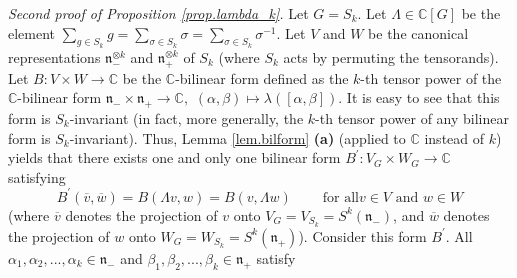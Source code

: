 \documentclass[etingof-lie.tex]{subfiles}
\begin{document}
\textit{Second proof of Proposition \ref{prop.lambda_k}.} Let $G=S_{k}$. Let
$\Lambda\in\mathbb{C}\left[  G\right]  $ be the element $\sum\limits_{g\in
S_{k}}g=\sum\limits_{\sigma\in S_{k}}\sigma=\sum\limits_{\sigma\in S_{k}%
}\sigma^{-1}$. Let $V$ and $W$ be the canonical representations $\mathfrak{n}%
_{-}^{\otimes k}$ and $\mathfrak{n}_{+}^{\otimes k}$ of $S_{k}$ (where $S_{k}$
acts by permuting the tensorands). Let $B:V\times W\rightarrow\mathbb{C}$ be
the $\mathbb{C}$-bilinear form defined as the $k$-th tensor power of the
$\mathbb{C}$-bilinear form $\mathfrak{n}_{-}\times\mathfrak{n}_{+}%
\rightarrow\mathbb{C},$ $\left(  \alpha,\beta\right)  \mapsto\lambda\left(
\left[  \alpha,\beta\right]  \right)  $. It is easy to see that this form is
$S_{k}$-invariant (in fact, more generally, the $k$-th tensor power of any
bilinear form is $S_{k}$-invariant). Thus, Lemma \ref{lem.bilform}
\textbf{(a)} (applied to $\mathbb{C}$ instead of $k$) yields that there exists
one and only one bilinear form $B^{\prime}:V_{G}\times W_{G}\rightarrow
\mathbb{C}$ satisfying%
\begin{equation}
B^{\prime}\left(  \overline{v},\overline{w}\right)  =B\left(  \Lambda
v,w\right)  =B\left(  v,\Lambda w\right)  \ \ \ \ \ \ \ \ \ \ \text{for all
}v\in V\text{ and }w\in W \label{thm.invformnondeg.pf.B'}%
\end{equation}
(where $\overline{v}$ denotes the projection of $v$ onto $V_{G}=V_{S_{k}%
}=S^{k}\left(  \mathfrak{n}_{-}\right)  $, and $\overline{w}$ denotes the
projection of $w$ onto $W_{G}=W_{S_{k}}=S^{k}\left(  \mathfrak{n}_{+}\right)
$). Consider this form $B^{\prime}$. All $\alpha_{1},\alpha_{2},...,\alpha
_{k}\in\mathfrak{n}_{-}$ and $\beta_{1},\beta_{2},...,\beta_{k}\in
\mathfrak{n}_{+}$ satisfy%
\end{document}

